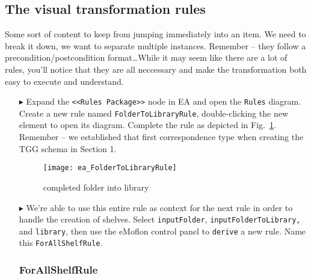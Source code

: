 \newpage
\hypertarget{treeToModel vis}{}
\subsection{The visual transformation rules}
\visHeader

Some sort of content to keep from jumping immediately into an item. We need to break it down, we want to separate multiple instances. Remember -- they follow a
precondition/postcondition format\ldots While it may seem like there are a lot of rules, you'll notice that they are all neccessary and make the transformation
both easy to execute and understand.

\begin{itemize}

\subsubsection{FolderToLibraryRule} %

\item[$\blacktriangleright$] Expand the \texttt{<<Rules Package>>} node in EA and open the \texttt{Rules} diagram. Create a new rule named
\texttt{FolderToLibraryRule}, double-clicking the new element to open its diagram. Complete the rule as depicted in Fig.~\ref{ea:FolderIntoLibrary_Complete}.
Remember -- we established that first correspondence type when creating the TGG schema in Section 1.

\vspace{0.5cm}

\begin{figure}[htbp]
\begin{center}
  \texttt{[image: ea\_FolderToLibraryRule]}
  \caption{completed folder into library}
  \label{ea:FolderIntoLibrary_Complete}
\end{center}
\end{figure}

\item[$\blacktriangleright$] We're able to use this entire rule as context for the next rule in order to handle the creation of shelves. Select
\texttt{inputFolder}, \texttt{in\-put\-Fol\-der\-To\-Lib\-rary,} and \texttt{library}, then use the eMoflon control panel to \texttt{derive} a new rule. Name
this \texttt{ForAllShelfRule}. %

\subsubsection{ForAllShelfRule} %


\end{itemize}
